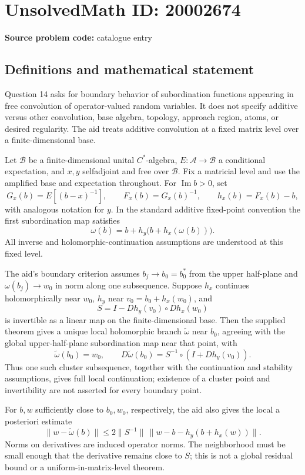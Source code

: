 \documentclass[11pt]{article}
\begin{document}
\section*{UnsolvedMath ID: 20002674}
\textbf{Source problem code:} catalogue entry
\subsection{Definitions and mathematical statement}
Question 14 asks for boundary behavior of subordination functions appearing in free convolution of operator-valued random variables. It does not specify additive versus other convolution, base algebra, topology, approach region, atoms, or desired regularity. The aid treats additive convolution at a fixed matrix level over a finite-dimensional base.

Let $\mathcal B$ be a finite-dimensional unital $C^*$-algebra, $E:\mathcal A\to\mathcal B$ a conditional expectation, and $x,y$ selfadjoint and free over $\mathcal B$. Fix a matricial level and use the amplified base and expectation throughout. For $\operatorname{Im}b>0$, set
\[
G_x(b)=E[(b-x)^{-1}],\qquad F_x(b)=G_x(b)^{-1},\qquad h_x(b)=F_x(b)-b,
\]
with analogous notation for $y$. In the standard additive fixed-point convention the first subordination map satisfies
\[
\omega(b)=b+h_y\bigl(b+h_x(\omega(b))\bigr).
\]
All inverse and holomorphic-continuation assumptions are understood at this fixed level.

The aid's boundary criterion assumes $b_j\to b_0=b_0^*$ from the upper half-plane and $\omega(b_j)\to w_0$ in norm along one subsequence. Suppose $h_x$ continues holomorphically near $w_0$, $h_y$ near $v_0=b_0+h_x(w_0)$, and
\[
S=I-Dh_y(v_0)\circ Dh_x(w_0)
\]
is invertible as a linear map on the finite-dimensional base. Then the supplied theorem gives a unique local holomorphic branch $\widetilde\omega$ near $b_0$, agreeing with the global upper-half-plane subordination map near that point, with
\[
\widetilde\omega(b_0)=w_0,\qquad
D\widetilde\omega(b_0)=S^{-1}\circ(I+Dh_y(v_0)).
\]
Thus one such cluster subsequence, together with the continuation and stability assumptions, gives full local continuation; existence of a cluster point and invertibility are not asserted for every boundary point.

For $b,w$ sufficiently close to $b_0,w_0$, respectively, the aid also gives the local a posteriori estimate
\[
\|w-\widetilde\omega(b)\|
\leq2\|S^{-1}\|\,
\|w-b-h_y(b+h_x(w))\|.
\]
Norms on derivatives are induced operator norms. The neighborhood must be small enough that the derivative remains close to $S$; this is not a global residual bound or a uniform-in-matrix-level theorem.
\end{document}
